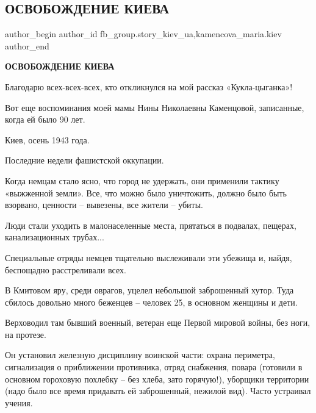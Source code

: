  
 
 
 
 
 
\subsection{ОСВОБОЖДЕНИЕ КИЕВА}
\label{sec:27_01_2021.fb.fb_group.story_kiev_ua.1.osvobozhdenie_kieva}
 
\ifcmt
 author_begin
   author_id fb_group.story_kiev_ua,kamencova_maria.kiev
 author_end
\fi

\textbf{ОСВОБОЖДЕНИЕ КИЕВА}

Благодарю всех-всех-всех, кто откликнулся на мой рассказ «Кукла-цыганка»!

Вот еще воспоминания моей мамы Нины Николаевны Каменцовой, записанные, когда ей
было 90 лет.

Киев, осень 1943 года.

Последние недели фашистской оккупации.

Когда немцам стало ясно, что город не удержать, они применили тактику
«выжженной земли». Все, что можно было уничтожить, должно было быть взорвано,
ценности – вывезены, все жители – убиты.

Люди стали уходить в малонаселенные места, прятаться в подвалах, пещерах,
канализационных трубах...

Специальные отряды немцев тщательно выслеживали эти убежища и, найдя,
беспощадно расстреливали всех.

В Кмитовом яру, среди оврагов, уцелел небольшой заброшенный хутор. Туда сбилось
довольно много беженцев – человек 25, в основном женщины и дети.

Верховодил там бывший военный, ветеран еще Первой мировой войны, без ноги, на
протезе.

Он установил железную дисциплину воинской части: охрана периметра, сигнализация
о приближении противника, отряд снабжения, повара (готовили в основном
гороховую похлебку – без хлеба, зато горячую!), уборщики территории (надо было
все время придавать ей заброшенный, нежилой вид). Часто устраивал учения.

